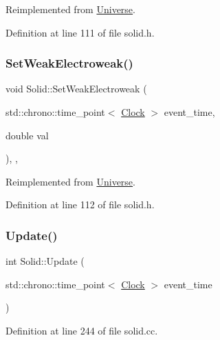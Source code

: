Reimplemented from \hyperlink{class_universe_a0f5cd04081b41ee931c0557dc397f6fb}{Universe}.



Definition at line 111 of file solid.\+h.

\mbox{\label{class_solid_adb34befc66f8c681f3a85c44e0d00e3a}} 
\subsubsection{\texorpdfstring{Set\+Weak\+Electroweak()}{SetWeakElectroweak()}}
{\footnotesize\ttfamily void Solid\+::\+Set\+Weak\+Electroweak (\begin{DoxyParamCaption}\item[{std\+::chrono\+::time\+\_\+point$<$ \hyperlink{universe_8h_a0ef8d951d1ca5ab3cfaf7ab4c7a6fd80}{Clock} $>$}]{event\+\_\+time,  }\item[{double}]{val }\end{DoxyParamCaption})\hspace{0.3cm}{\ttfamily [inline]}, {\ttfamily [final]}, {\ttfamily [virtual]}}



Reimplemented from \hyperlink{class_universe_a2d3d642bfdc863248e93535832fa4b00}{Universe}.



Definition at line 112 of file solid.\+h.

\mbox{\label{class_solid_a248a5eab9fa0c584af7cdec2f86dc3a3}} 
\subsubsection{\texorpdfstring{Update()}{Update()}}
{\footnotesize\ttfamily int Solid\+::\+Update (\begin{DoxyParamCaption}\item[{std\+::chrono\+::time\+\_\+point$<$ \hyperlink{universe_8h_a0ef8d951d1ca5ab3cfaf7ab4c7a6fd80}{Clock} $>$}]{event\+\_\+time }\end{DoxyParamCaption})}



Definition at line 244 of file solid.\+cc.

